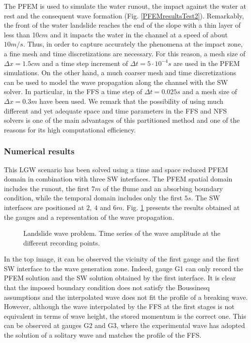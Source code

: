 The PFEM is used to simulate the water runout, the impact against the water at rest and the consequent wave formation (Fig. \ref{PFEMresultsTest2}). Remarkably, the front of the water landslide reaches the end of the slope with a thin layer of less than 10$cm$ and it impacts the water in the channel at a speed of about $10m/s$. Thus, in order to capture accurately the phenomena at the impact zone, a fine mesh and time discretizations are necessary. For this reason, a mesh size of $\Delta x=1.5cm$ and a time step increment of $\Delta t=5\cdot10^{-4}s$ are used in the PFEM simulations. 
On the other hand, a much coarser mesh and time discretizations can be used to model the wave propagation along the channel with the SW solver. In particular, in the FFS a time step of $\Delta t=0.025s$ and a mesh size of $\Delta x=0.3m$ have been used. We remark that the possibility of using much different and yet adequate space and time parameters in the FFS and NFS solvers is one of the main advantages of this partitioned method and one of the reasons for its high computational efficiency.



\subsubsection{Numerical results}

This LGW scenario has been solved using a time and space reduced PFEM domain in combination with three SW interfaces.
The PFEM spatial domain includes the runout, the first $7m$ of the flume and an absorbing boundary condition, while the temporal domain includes only the first $5s$.
The SW interfaces are positioned at $2,\ 4$ and $6m$. Fig. \ref{landslide_wave_propagation} presents the results obtained at the gauges and a representation of the wave propagation.

\begin{figure} [htb]
    \centering
    \caption{Landslide wave problem. Time series of the wave amplitude at the different recording points.}
    \label{landslide_wave_propagation}
\end{figure}


In the top image, it can be observed the vicinity of the first gauge and the first SW interface to the wave generation zone. Indeed, gauge G1 can only record the PFEM solution and the SW solution obtained by the first interface. It is clear that the imposed boundary condition does not satisfy the Boussinesq assumptions and the interpolated wave does not fit the profile of a breaking wave.
However, although the wave interpolated by the FFS at the first stages is not equivalent in terms of wave height, the stored momentum is the correct one. This can be observed at gauges G2 and G3, where the experimental wave has adopted the solution of a solitary wave and matches the profile of the FFS.

